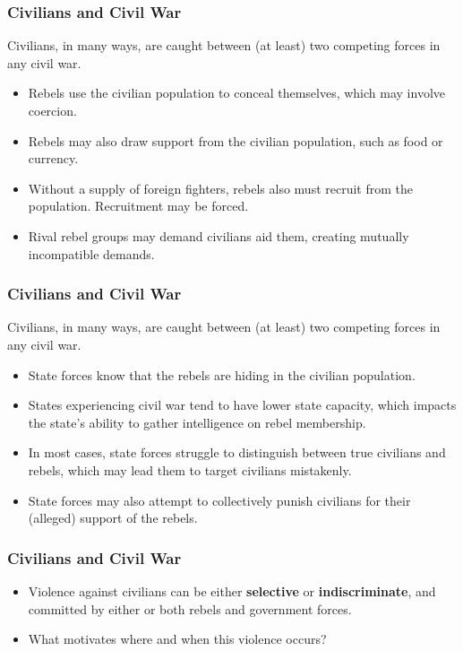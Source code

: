 \documentclass{beamer}
\begin{document}
\begin{frame} 
	\frametitle{\LARGE{Civilians and Civil War}}
Civilians, in many ways, are caught between (at least) two competing forces in any civil war.
	\begin{itemize}
		\item Rebels use the civilian population to conceal themselves, which may involve coercion. \pause
		\item Rebels may also draw support from the civilian population, such as food or currency. \pause
		\item Without a supply of foreign fighters, rebels also must recruit from the population. Recruitment may be forced. \pause
		\item Rival rebel groups may demand civilians aid them, creating mutually incompatible demands.
	\end{itemize}
\end{frame}

\begin{frame} 
	\frametitle{\LARGE{Civilians and Civil War}}
Civilians, in many ways, are caught between (at least) two competing forces in any civil war.
	\begin{itemize}
		\item State forces know that the rebels are hiding in the civilian population. \pause
		\item States experiencing civil war tend to have lower state capacity, which impacts the state's ability to gather intelligence on rebel membership. \pause
		\item In most cases, state forces struggle to distinguish between true civilians and rebels, which may lead them to target civilians mistakenly. \pause
		\item State forces may also attempt to collectively punish civilians for their (alleged) support of the rebels.
	\end{itemize}
\end{frame}

\begin{frame} 
	\frametitle{\LARGE{Civilians and Civil War}}
	\begin{itemize}
		\item Violence against civilians can be either \textbf{selective} or \textbf{indiscriminate}, and committed by either or both rebels and government forces. \pause
		\item What motivates where and when this violence occurs?		
	\end{itemize}
\end{frame}
\end{document}
